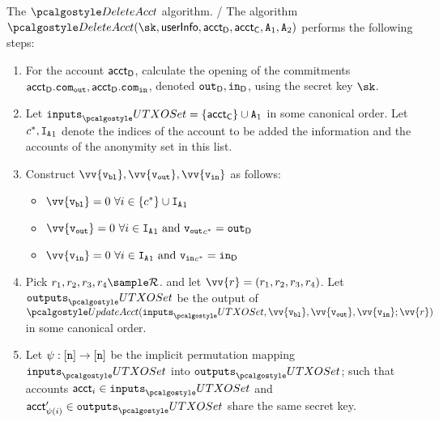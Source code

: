 \begin{boxfig}{\label{fig:deleteAcct}{The $\deleteAcct$ algorithm.}}
/ 
The algorithm $\deleteAcct(\sk, \userinfo, \accttodelete, \accttotransfer, \anset_1, \anset_2)$ performs the following steps:
\begin{enumerate}
    \item For the account $\textup{\textsf{acct}}_\textsf{D}$, calculate the opening of the commitments $\textup{\textsf{acct}}_\textsf{D}.\texttt{com}_{\textup{\texttt{{out}}}}, \textup{\textsf{acct}}_\textsf{D}.\texttt{com}_{\textup{\texttt{{in}}}}$, denoted $\textup{\texttt{{out}}}_\textsf{D}, \textup{\texttt{{in}}}_\textsf{D}$, using the secret key $\sk$.
    \item Let  $\inputs_\utxoset = \{\accttotransfer\} \cup \anset_1$ in some canonical order.
    Let $c^*, {{\mathtt{I}_{\mathtt{A}}}_1}$ denote the indices of the account to be added the information and the accounts of the anonymity set in this list.
    \item Construct $\vv{\vbl}, \vv{\vout}, \vv{\vin}$ as follows:
    \begin{itemize}
        \item $\vv{\vbl} = 0 \ \forall i \in \{c^*\}\cup {\ianset}_1$ 
        \item $\vv{\vout} = 0 \ \forall i \in {{\ianset}_1} \text{ and } {\vout}_{c^*} = \outdelete$
        \item $\vv{\vin} = 0 \ \forall i \in {{\ianset}_1} \text{ and } {\vin}_{c^*} = \indelete$
    \end{itemize}
    \item Pick $r_1, r_2, r_3, r_4 \sample \randspace$. and let $\vv{r} = (r_1, r_2, r_3, r_4)$. Let $\outputs_\utxoset$ be the output of $\updacc(\inputs_\utxoset,\vv{\vbl}, \vv{\vout}, \vv{\vin}; \vv{r})$ in some canonical order.
    \item Let $\psi:[{\textup{\texttt{n}}}]\rightarrow [{\textup{\texttt{n}}}]$ be the implicit permutation mapping $\inputs_\utxoset$ into $\outputs_\utxoset$; such that accounts $\acct_i \in \inputs_\utxoset$ and $\acct^\prime_{\psi(i)}\in \outputs_\utxoset$ share the same secret key.
    

\end{enumerate}
\end{boxfig}
